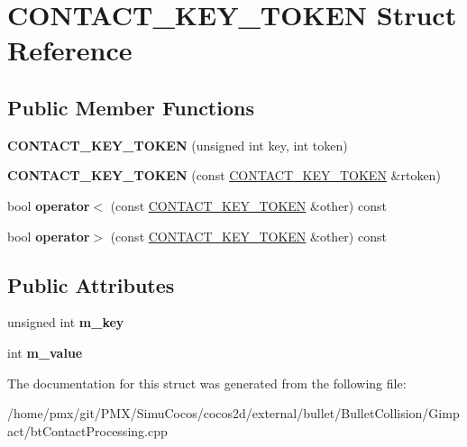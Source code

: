\hypertarget{structCONTACT__KEY__TOKEN}{}\section{C\+O\+N\+T\+A\+C\+T\+\_\+\+K\+E\+Y\+\_\+\+T\+O\+K\+EN Struct Reference}
\label{structCONTACT__KEY__TOKEN}
\subsection*{Public Member Functions}
\begin{DoxyCompactItemize}
\item 
\mbox{\label{structCONTACT__KEY__TOKEN_a482c5bff119f350e0bceed3a34418669}} 
{\bfseries C\+O\+N\+T\+A\+C\+T\+\_\+\+K\+E\+Y\+\_\+\+T\+O\+K\+EN} (unsigned int key, int token)
\item 
\mbox{\label{structCONTACT__KEY__TOKEN_a97e41c197782e4eacd1c61a1208c536f}} 
{\bfseries C\+O\+N\+T\+A\+C\+T\+\_\+\+K\+E\+Y\+\_\+\+T\+O\+K\+EN} (const \hyperlink{structCONTACT__KEY__TOKEN}{C\+O\+N\+T\+A\+C\+T\+\_\+\+K\+E\+Y\+\_\+\+T\+O\+K\+EN} \&rtoken)
\item 
\mbox{\label{structCONTACT__KEY__TOKEN_a43824c6e0cf2e9af69dfa07c89e298ba}} 
bool {\bfseries operator$<$} (const \hyperlink{structCONTACT__KEY__TOKEN}{C\+O\+N\+T\+A\+C\+T\+\_\+\+K\+E\+Y\+\_\+\+T\+O\+K\+EN} \&other) const
\item 
\mbox{\label{structCONTACT__KEY__TOKEN_aa6f0a2017b0c89093643d1caca574542}} 
bool {\bfseries operator$>$} (const \hyperlink{structCONTACT__KEY__TOKEN}{C\+O\+N\+T\+A\+C\+T\+\_\+\+K\+E\+Y\+\_\+\+T\+O\+K\+EN} \&other) const
\end{DoxyCompactItemize}
\subsection*{Public Attributes}
\begin{DoxyCompactItemize}
\item 
\mbox{\label{structCONTACT__KEY__TOKEN_aa11c41597f20668b4d67b1c2c14ddb53}} 
unsigned int {\bfseries m\+\_\+key}
\item 
\mbox{\label{structCONTACT__KEY__TOKEN_a22a1b73554e87881505f79d2422b3501}} 
int {\bfseries m\+\_\+value}
\end{DoxyCompactItemize}


The documentation for this struct was generated from the following file\+:\begin{DoxyCompactItemize}
\item 
/home/pmx/git/\+P\+M\+X/\+Simu\+Cocos/cocos2d/external/bullet/\+Bullet\+Collision/\+Gimpact/bt\+Contact\+Processing.\+cpp\end{DoxyCompactItemize}
